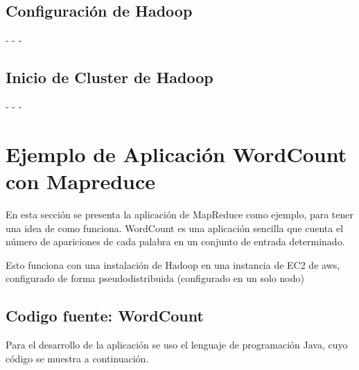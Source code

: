 \subsection{Configuración de Hadoop}


-
-
-

\subsection{Inicio de Cluster de Hadoop}

-
-
-




\clearpage

\section{Ejemplo de Aplicación WordCount con Mapreduce}
\justify
En esta sección se presenta la aplicación de MapReduce como ejemplo, para tener una idea de como funciona.
WordCount es una aplicación sencilla que cuenta el número de apariciones de cada palabra en un conjunto de entrada determinado.

Esto funciona con una instalación de Hadoop en una instancia de EC2 de aws, configurado de forma pseudodistribuida (configurado en un solo nodo) 
 
 
 \subsection{Codigo fuente: WordCount}
 
 Para el desarrollo de la aplicación se uso el lenguaje de programación Java, cuyo código se muestra a continuación.

